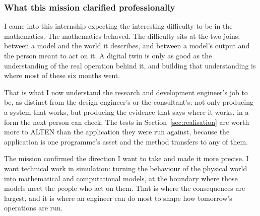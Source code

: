 \subsubsection{What this mission clarified professionally}

I came into this internship expecting the interesting difficulty to be in the mathematics. The
mathematics behaved. The difficulty sits at the two joins: between a model and the world it
describes, and between a model's output and the person meant to act on it. A digital twin is
only as good as the understanding of the real operation behind it, and building that
understanding is where most of these six months went.

That is what I now understand the research and development engineer's job to be, as distinct
from the design engineer's or the consultant's: not only producing a system that works, but
producing the evidence that says where it works, in a form the next person can check. The
tests in Section~\ref{sec:realisation} are worth more to ALTEN than the application they were
run against, because the application is one programme's asset and the method transfers to any
of them.

The mission confirmed the direction I want to take and made it more precise. I want technical
work in simulation: turning the behaviour of the physical world into mathematical and
computational models, at the boundary where those models meet the people who act on them.
That is where the consequences are largest, and it is where an engineer can do most to shape
how tomorrow's operations are run.
